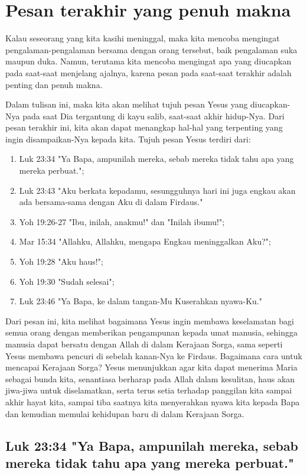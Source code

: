 
\section{Pesan terakhir yang penuh makna}
Kalau seseorang yang kita kasihi meninggal, maka kita mencoba mengingat pengalaman-pengalaman bersama dengan orang tersebut, baik pengalaman suka
maupun duka. Namun, terutama kita mencoba mengingat apa yang diucapkan pada
saat-saat menjelang ajalnya, karena pesan pada saat-saat terakhir adalah
penting dan penuh makna.

Dalam tulisan ini, maka kita akan melihat tujuh pesan Yesus yang diucapkan-Nya
pada saat Dia tergantung di kayu salib, saat-saat akhir hidup-Nya. Dari pesan
terakhir ini, kita akan dapat menangkap hal-hal yang terpenting yang ingin
disampaikan-Nya kepada kita. Tujuh pesan Yesus terdiri dari:
\begin{enumerate}
\item Luk 23:34 "Ya
Bapa, ampunilah mereka, sebab mereka tidak tahu apa yang mereka perbuat."; 
\item Luk 23:43 "Aku berkata kepadamu, sesungguhnya hari ini juga engkau akan ada
bersama-sama dengan Aku di dalam Firdaus." 
\item Yoh 19:26-27 "Ibu, inilah,
anakmu!" dan "Inilah ibumu!"; 
\item Mar 15:34 "Allahku, Allahku, mengapa Engkau
meninggalkan Aku?"; 
\item Yoh 19:28 "Aku haus!"; 
\item Yoh 19:30 "Sudah selesai";
\item Luk 23:46 "Ya Bapa, ke dalam tangan-Mu Kuserahkan nyawa-Ku."
\end{enumerate}

Dari pesan ini, kita melihat bagaimana Yesus ingin membawa keselamatan bagi
semua orang dengan memberikan pengampunan kepada umat manusia, sehingga manusia
dapat bersatu dengan Allah di dalam Kerajaan Sorga, sama seperti Yesus membawa
pencuri di sebelah kanan-Nya ke Firdaus. Bagaimana cara untuk mencapai Kerajaan
Sorga? Yesus menunjukkan agar kita dapat menerima Maria sebagai bunda kita,
senantiasa berharap pada Allah dalam kesulitan, haus akan jiwa-jiwa untuk
diselamatkan, serta terus setia terhadap panggilan kita sampai akhir hayat
kita, sampai tiba saatnya kita menyerahkan nyawa kita kepada Bapa dan kemudian
memulai kehidupan baru di dalam Kerajaan Sorga.

\subsection{Luk 23:34 "Ya Bapa, ampunilah mereka, sebab mereka tidak tahu apa yang
mereka perbuat."}

